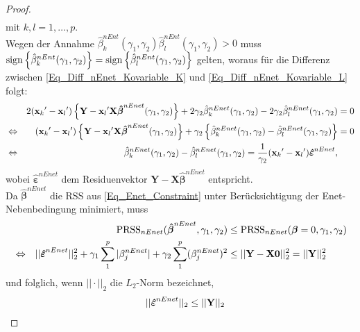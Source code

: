 \documentclass[12pt, a4paper]{report}\usepackage[]{graphicx}\usepackage[]{color}
\begin{document}
\begin{appendix}
\begin{proof}
\begin{align}
\end{align}
mit $k,l = 1, \dots, p$.\\
Wegen der Annahme $\hat{\beta}^{nEnt}_k(\gamma_1,\gamma_2) \hat{\beta}^{nEnt}_l(\gamma_1,\gamma_2) >0$ muss $\textnormal{sign}\left\lbrace\hat{\beta}^{nEnt}_k(\gamma_1,\gamma_2)\right\rbrace=\textnormal{sign}\left\lbrace\hat{\beta}^{nEnt}_l(\gamma_1,\gamma_2)\right\rbrace$ gelten, woraus für die Differenz zwischen \eqref{Eq_Diff_nEnet_Kovariable_K} und \eqref{Eq_Diff_nEnet_Kovariable_L} folgt:
\begin{align} 
&& 2(\mathbf{x}_k{'} - \mathbf{x}_l{'})\left\lbrace\mathbf{Y}-\mathbf{x}_l{'}\mathbf{X}\boldsymbol{\hat{\beta}}^{nEnet}(\gamma_1,\gamma_2)\right\rbrace+2\gamma_2\hat{\beta}_k^{nEnet}(\gamma_1,\gamma_2) - 2\gamma_2\hat{\beta}_l^{nEnet}(\gamma_1,\gamma_2)&=0 \notag \\
&\Leftrightarrow& (\mathbf{x}_k{'} - \mathbf{x}_l{'})\left\lbrace\mathbf{Y}-\mathbf{x}_l{'}\mathbf{X}\boldsymbol{\hat{\beta}}^{nEnet}(\gamma_1,\gamma_2)\right\rbrace+\gamma_2\left\lbrace\hat{\beta}_k^{nEnet}(\gamma_1,\gamma_2) - \hat{\beta}_l^{nEnet}(\gamma_1,\gamma_2)\right\rbrace&=0 \notag \\
&\Leftrightarrow& \hat{\beta}_k^{nEnet}(\gamma_1,\gamma_2) - \hat{\beta}_l^{nEnet}(\gamma_1,\gamma_2) = \frac{1}{\gamma_2} (\mathbf{x}_k{'} - \mathbf{x}_l{'}) \boldsymbol{\hat{\varepsilon}}^{nEnet} \label{Eq_Diff_nEnet_Schätzer_unnormiert},
\end{align}
wobei $\boldsymbol{\hat{\varepsilon}}^{nEnet}$ dem Residuenvektor  $\mathbf{Y}-\mathbf{X}\boldsymbol{\hat{\beta}}^{nEnet}$ entspricht.\\
Da $\boldsymbol{\hat{\beta}}^{nEnet}$ die RSS aus \eqref{Eq_Enet_Constraint} unter Berücksichtigung der Enet-Nebenbedingung minimiert, muss 
\begin{align*}
&& \textnormal{PRSS}_{nEnet}(\boldsymbol{\hat{\beta}}^{nEnet}, \gamma_1,\gamma_2) &\leq \textnormal{PRSS}_{nEnet}(\boldsymbol{\beta}=0, \gamma_1,\gamma_2) \\
&\Leftrightarrow& ||\boldsymbol{\hat{\varepsilon}}^{nEnet}||^2_2 + \gamma_1 \sum_{1}^{p}|\beta_j^{nEnet}|+\gamma_2 \sum_{1}^{p}(\beta_j^{nEnet})^2 &\leq ||\mathbf{Y}-\mathbf{X}\mathbf{0}||^2_2=||\mathbf{Y}||^2_2
\end{align*}
und folglich, wenn $||\cdot||_2$ die $L_2$-Norm bezeichnet,
\begin{align}\label{Eq_Verhaeltnis_Enet_Resid_vs_Y2}
&& ||\boldsymbol{\hat{\varepsilon}}^{nEnet}||_2 &\leq ||\mathbf{Y}||_2 \notag \\

\end{align}
\end{proof}
\end{appendix}
\end{document}
